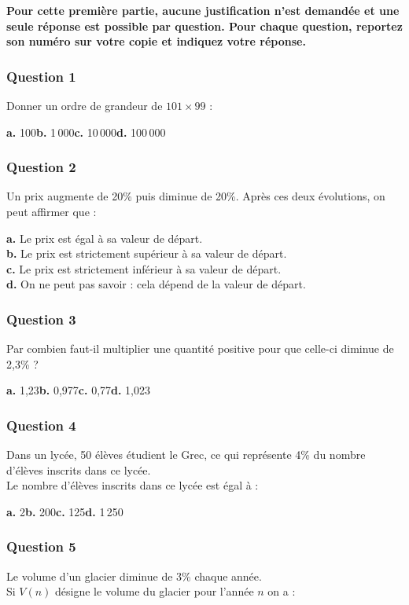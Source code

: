 \textbf{Pour cette première partie, aucune justification n'est demandée et une seule réponse est possible par question. Pour chaque question, reportez son numéro sur votre copie et indiquez votre réponse.}

\subsubsection*{Question 1}
Donner un ordre de grandeur de $101 \times 99$ :

\textbf{a.} 100\hfill \textbf{b.} 1\,000\hfill \textbf{c.} 10\,000\hfill \textbf{d.} 100\,000

\subsubsection*{Question 2}
Un prix augmente de 20\% puis diminue de 20\%. Après ces deux évolutions, on peut affirmer que :

\textbf{a.} Le prix est égal à sa valeur de départ. \\
\textbf{b.} Le prix est strictement supérieur à sa valeur de départ. \\
\textbf{c.} Le prix est strictement inférieur à sa valeur de départ. \\
\textbf{d.} On ne peut pas savoir : cela dépend de la valeur de départ.

\subsubsection*{Question 3}
Par combien faut-il multiplier une quantité positive pour que celle-ci diminue de 2,3\% ?

\textbf{a.} 1,23\hfill \textbf{b.} 0,977\hfill \textbf{c.} 0,77\hfill \textbf{d.} 1,023

\subsubsection*{Question 4}
Dans un lycée, 50 élèves étudient le Grec, ce qui représente 4\% du nombre d'élèves inscrits dans ce lycée. \\
Le nombre d'élèves inscrits dans ce lycée est égal à :

\textbf{a.} 2\hfill \textbf{b.} 200\hfill \textbf{c.} 125\hfill \textbf{d.} 1\,250

\subsubsection*{Question 5}
Le volume d'un glacier diminue de 3\% chaque année. \\
Si $V(n)$ désigne le volume du glacier pour l'année $n$ on a :

